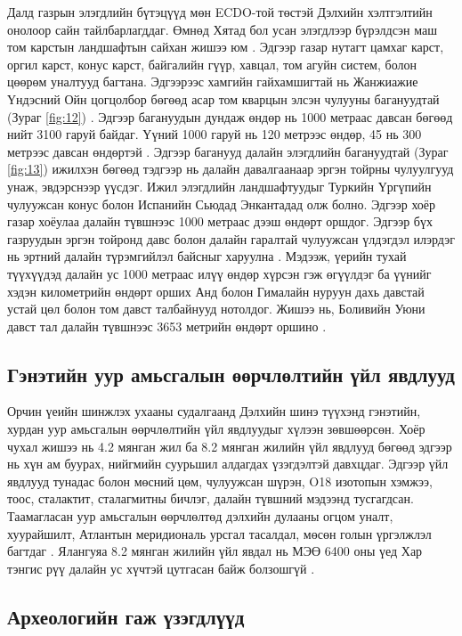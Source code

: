 \documentclass[10pt,twocolumn,letterpaper]{article}
\begin{document}
Далд газрын элэгдлийн бүтэцүүд мөн ECDO-той төстэй Дэлхийн хэлтгэлтийн онолоор сайн тайлбарлагддаг. Өмнөд Хятад бол усан элэгдлээр бүрэлдсэн маш том карстын ландшафтын сайхан жишээ юм \cite{82}. Эдгээр газар нутагт цамхаг карст, оргил карст, конус карст, байгалийн гүүр, хавцал, том агуйн систем, болон цөөрөм уналтууд багтана. Эдгээрээс хамгийн гайхамшигтай нь Жанжиажие Үндэсний Ойн цогцолбор бөгөөд асар том кварцын элсэн чулууны багануудтай (Зураг \ref{fig:12}) \cite{84}. Эдгээр багануудын дундаж өндөр нь 1000 метраас давсан бөгөөд нийт 3100 гаруй байдаг. Үүний 1000 гаруй нь 120 метрээс өндөр, 45 нь 300 метрээс давсан өндөртэй \cite{85}. Эдгээр баганууд далайн элэгдлийн багануудтай (Зураг \ref{fig:13}) ижилхэн бөгөөд тэдгээр нь далайн давалгаанаар эргэн тойрны чулуулгууд унаж, эвдэрснээр үүсдэг. Ижил элэгдлийн ландшафтуудыг Туркийн Үргүпийн чулуужсан конус болон Испанийн Сьюдад Энкантадад олж болно. Эдгээр хоёр газар хоёулаа далайн түвшнээс 1000 метраас дээш өндөрт оршдог. Эдгээр бүх газруудын эргэн тойронд давс болон далайн гаралтай чулуужсан үлдэгдэл илэрдэг нь эртний далайн түрэмгийлэл байсныг харуулна \cite{15,86,87}. Мэдээж, үерийн тухай түүхүүдэд \cite{3} далайн ус 1000 метраас илүү өндөр хүрсэн гэж өгүүлдэг ба үүнийг хэдэн километрийн өндөрт орших Анд болон Гималайн нуруун дахь давстай устай цөл болон том давст талбайнууд нотолдог. Жишээ нь, Боливийн Уюни давст тал далайн түвшнээс 3653 метрийн өндөрт оршино \cite{94}.

\subsection{Гэнэтийн уур амьсгалын өөрчлөлтийн үйл явдлууд}

Орчин үеийн шинжлэх ухааны судалгаанд Дэлхийн шинэ түүхэнд гэнэтийн, хурдан уур амьсгалын өөрчлөлтийн үйл явдлуудыг хүлээн зөвшөөрсөн. Хоёр чухал жишээ нь 4.2 мянган жил ба 8.2 мянган жилийн үйл явдлууд бөгөөд эдгээр нь хүн ам буурах, нийгмийн суурьшил алдагдах үзэгдэлтэй давхцдаг. Эдгээр үйл явдлууд тунадас болон мөсний цөм, чулуужсан шүрэн, O18 изотопын хэмжээ, тоос, сталактит, сталагмитны бичлэг, далайн түвшний мэдээнд тусгагдсан. Таамагласан уур амьсгалын өөрчлөлтөд дэлхийн дулааны огцом уналт, хуурайшилт, Атлантын меридиональ урсгал тасалдал, мөсөн голын үргэлжлэл багтдаг \cite{90,91,92}. Ялангуяа 8.2 мянган жилийн үйл явдал нь МЭӨ 6400 оны үед Хар тэнгис рүү далайн ус хүчтэй цутгасан байж болзошгүй \cite{93}.

\subsection{Археологийн гаж үзэгдлүүд}
\end{document}
